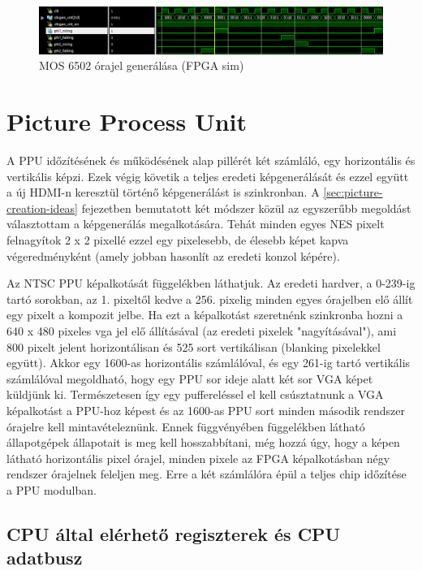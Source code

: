 \begin{figure}[H]
	\centering
	\includegraphics[width=150mm, keepaspectratio]{figures/fpga-ph1-ph2}
	\caption{MOS 6502 órajel generálása (FPGA sim)} 
	\label{fig:FPGA-phi1-phi2}
\end{figure} 

\section{Picture Process Unit}
\label{sec:PPU-FPGA}

A PPU időzítésének és működésének alap pillérét két számláló, egy horizontális és vertikális képzi. Ezek végig követik a teljes eredeti képgenerálását és ezzel együtt a új HDMI-n keresztül történő képgenerálást is szinkronban. A \ref{sec:picture-creation-ideas} fejezetben bemutatott két módszer közül az egyszerűbb megoldást választottam a képgenerálás megalkotására. Tehát minden egyes NES pixelt felnagyítok 2 x 2 pixellé ezzel egy pixelesebb, de élesebb képet kapva végeredményként (amely jobban hasonlít az eredeti konzol képére).

Az NTSC PPU képalkotását  függelékben láthatjuk. Az eredeti hardver, a 0-239-ig tartó sorokban, az 1. pixeltől kedve a 256. pixelig minden egyes órajelben elő állít egy pixelt a kompozit jelbe. Ha ezt a képalkotást szeretnénk szinkronba hozni a 640 x 480 pixeles vga jel elő állításával (az eredeti pixelek "nagyításával"), ami 800 pixelt jelent horizontálisan és 525 sort vertikálisan (blanking pixelekkel együtt). Akkor egy 1600-as horizontális számlálóval, és egy 261-ig tartó vertikális számlálóval megoldható, hogy egy PPU sor ideje alatt két sor VGA képet küldjünk ki. Természetesen így egy puffereléssel el kell csúsztatnunk a VGA képalkotást a PPU-hoz képest és az 1600-as PPU sort minden második rendszer órajelre kell mintavételeznünk. Ennek függvényében  függelékben látható állapotgépek állapotait is meg kell hosszabbítani, még hozzá úgy, hogy a képen látható horizontális pixel órajel, minden pixele az FPGA képalkotásban négy rendszer órajelnek feleljen meg. Erre a két számlálóra épül a teljes chip időzítése a PPU modulban. 

	\subsection{CPU által elérhető regiszterek és CPU adatbusz}
	\label{sec:CPU-databus-ppu_reg}
	
